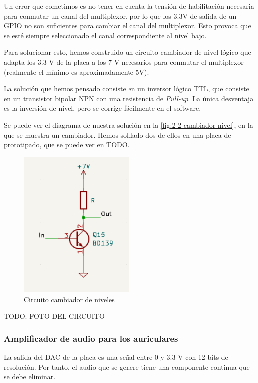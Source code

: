 Un error que cometimos es no tener en cuenta la tensión de habilitación necesaria para conmutar un canal del multiplexor, por lo que los 3.3V de salida de un GPIO no son suficientes para cambiar el canal del multiplexor. Esto provoca que se esté siempre seleccionado el canal correspondiente al nivel bajo.

Para solucionar esto, hemos construido un circuito cambiador de nivel lógico que adapta los 3.3 V de la placa a los 7 V necesarios para conmutar el multiplexor (realmente el mínimo es aproximadamente 5V).

La solución que hemos pensado consiste en un inversor lógico TTL, que consiste en un transistor bipolar NPN con una resistencia de \textit{Pull-up}. La única desventaja es la inversión de nivel, pero se corrige fácilmente en el software.

Se puede ver el diagrama de nuestra solución en la \autoref{fig:2-2-cambiador-nivel}, en la que se muestra un cambiador. Hemos soldado dos de ellos en una placa de prototipado, que se puede ver en TODO.

\begin{figure}[h]
    \centering
    \includegraphics[width=0.5\textwidth]{images/2/2-2/circuitoCambiadorNivel.png}
    \caption{Circuito cambiador de niveles}
    \label{fig:label}
\end{figure}

TODO: FOTO DEL CIRCUITO

\subsubsection{Amplificador de audio para los auriculares}

La salida del DAC de la placa es una señal entre 0 y 3.3 V con 12 bits de resolución. Por tanto, el audio que se genere tiene una componente continua que se debe eliminar. 

